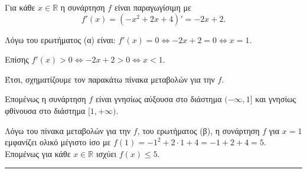 \begin{alist}
\item Για κάθε $x \in \mathbb{R}$ η συνάρτηση $f$ είναι παραγωγίσιμη με
\[ f'(x) = (-x^2 + 2x + 4)' = -2x + 2 . \]

\item Λόγω του ερωτήματος (α) είναι: $f'(x) = 0 \Leftrightarrow -2x + 2 = 0 \Leftrightarrow x = 1$.

Επίσης $f'(x) > 0 \Leftrightarrow -2x + 2 > 0 \Leftrightarrow x < 1$.

Έτσι, σχηματίζουμε τον παρακάτω πίνακα μεταβολών για την $f$.

\begin{center}
\end{center}

Επομένως η συνάρτηση $f$ είναι γνησίως αύξουσα στο διάστημα $(-\infty,1]$ και γνησίως φθίνουσα στο διάστημα $[1, +\infty)$.

\item Λόγω του πίνακα μεταβολών για την $f$, του ερωτήματος (β), η συνάρτηση $f$ για $x=1$ εμφανίζει ολικό μέγιστο ίσο με $f(1) = -1^2 + 2\cdot 1 + 4 = -1+2+4=5$. Επομένως για κάθε $x \in \mathbb{R}$ ισχύει $f(x) \le 5$.
\end{alist}
\vspace{6mm}
\noindent\rule{\textwidth}{0.4pt}
\vspace{6mm}

